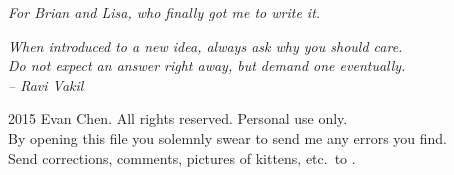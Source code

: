 \begin{titlepage}
	\vspace*{8cm}

	\begin{center}
		\itshape
		\noindent
		For Brian and Lisa, who finally got me to write it.
	\end{center}
\end{titlepage}


\begin{titlepage}
	\vspace*{8cm}
	\begin{flushright}
		\itshape\large
		When introduced to a new idea, always ask why you should care. \\[0.2cm]
		Do not expect an answer right away, but demand one eventually. \\[0.8cm]
		-- Ravi Vakil \cite{ref:vakil}
	\end{flushright}

	\vfill
	\large
	\noindent {\copyright} 2015 Evan Chen.  All rights reserved. Personal use only. \\[0.8cm]
	By opening this file you solemnly swear to send me any errors you find. \\ [0.4cm]
	Send corrections, comments, pictures of kittens, etc.\ to . 
	\vspace*{1cm}
\end{titlepage}
